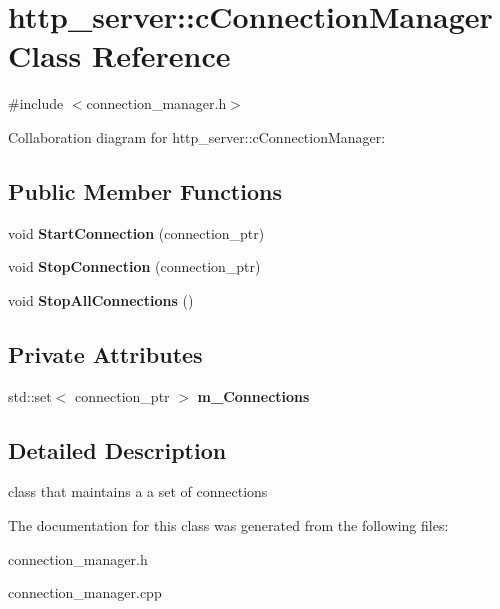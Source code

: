 \hypertarget{classhttp__server_1_1cConnectionManager}{\section{http\-\_\-server\-:\-:c\-Connection\-Manager Class Reference}
\label{classhttp__server_1_1cConnectionManager}
}


{\ttfamily \#include $<$connection\-\_\-manager.\-h$>$}



Collaboration diagram for http\-\_\-server\-:\-:c\-Connection\-Manager\-:
\subsection*{Public Member Functions}
\begin{DoxyCompactItemize}
\item 
\hypertarget{classhttp__server_1_1cConnectionManager_ab7741005e29b740894addaded7a17ee2}{void {\bfseries Start\-Connection} (connection\-\_\-ptr)}\label{classhttp__server_1_1cConnectionManager_ab7741005e29b740894addaded7a17ee2}

\item 
\hypertarget{classhttp__server_1_1cConnectionManager_a740f1202cf4db1493aac3c8f0a99bbb4}{void {\bfseries Stop\-Connection} (connection\-\_\-ptr)}\label{classhttp__server_1_1cConnectionManager_a740f1202cf4db1493aac3c8f0a99bbb4}

\item 
\hypertarget{classhttp__server_1_1cConnectionManager_a5dddb041d33c7bbb4220deaa9dd74b3c}{void {\bfseries Stop\-All\-Connections} ()}\label{classhttp__server_1_1cConnectionManager_a5dddb041d33c7bbb4220deaa9dd74b3c}

\end{DoxyCompactItemize}
\subsection*{Private Attributes}
\begin{DoxyCompactItemize}
\item 
\hypertarget{classhttp__server_1_1cConnectionManager_a6bc3632311d979511b8393d611b88752}{std\-::set$<$ connection\-\_\-ptr $>$ {\bfseries m\-\_\-\-Connections}}\label{classhttp__server_1_1cConnectionManager_a6bc3632311d979511b8393d611b88752}

\end{DoxyCompactItemize}


\subsection{Detailed Description}
class that maintains a a set of connections 

The documentation for this class was generated from the following files\-:\begin{DoxyCompactItemize}
\item 
connection\-\_\-manager.\-h\item 
connection\-\_\-manager.\-cpp\end{DoxyCompactItemize}
